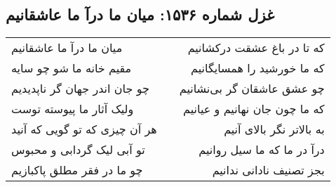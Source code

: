 \begin{center}
\section*{غزل شماره ۱۵۳۶: میان ما درآ ما عاشقانیم}
\label{sec:1536}
\begin{longtable}{l p{0.5cm} r}
میان ما درآ ما عاشقانیم
&&
که تا در باغ عشقت درکشانیم
\\
مقیم خانه ما شو چو سایه
&&
که ما خورشید را همسایگانیم
\\
چو جان اندر جهان گر ناپدیدیم
&&
چو عشق عاشقان گر بی‌نشانیم
\\
ولیک آثار ما پیوسته توست
&&
که ما چون جان نهانیم و عیانیم
\\
هر آن چیزی که تو گویی که آنید
&&
به بالاتر نگر بالای آنیم
\\
تو آبی لیک گردابی و محبوس
&&
درآ در ما که ما سیل روانیم
\\
چو ما در فقر مطلق پاکبازیم
&&
بجز تصنیف نادانی ندانیم
\\
\end{longtable}
\end{center}
